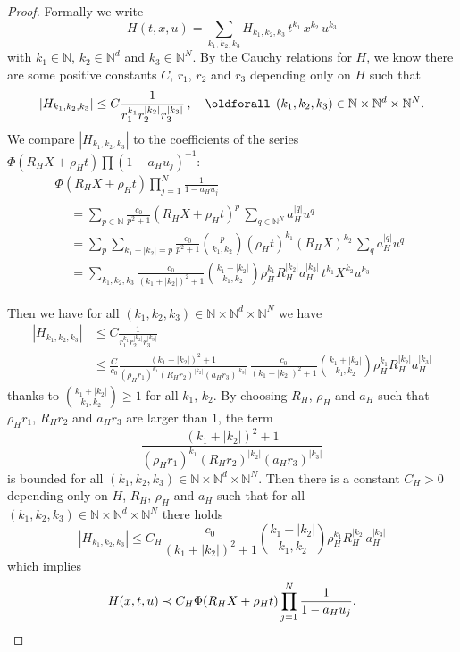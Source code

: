 \documentclass[AHL,Unicode,longabstracts,published]{cedram}
\theoremstyle{plain}
\newcommand*\N{{\mathbb N}}
\newcommand*\dsp{\displaystyle}
\renewcommand*{\forall}{\mathrel{\oldforall}}
\begin{document}
\begin{proof}
Formally we write
\[
H(t,x,u) = \sum_{k_1,k_2,k_3} H_{k_1,k_2,k_3} \,t^{k_1} \,x^{k_2} \, u^{k_3}
\]
with $k_1\in\N$, $k_2\in\N^{d}$ and $k_3\in\N^{N}$. By the Cauchy relations for $H$, we know there are some positive constants $C$, $r_1$, $r_2$ and $r_3$ depending only on $H$ such that
\[
|H_{k_1,k_2,k_3}| \leq C\frac{\dsp 1}{\dsp r_1^{k_1}r_2^{|k_2|}r_3^{|k_3|}} \,, \quad \forall \,(k_1, k_2,k_3)\in\N \times\N^{d} \times \N^{N}.
\]
We compare $ |H_{k_1,k_2,k_3}| $ to the coefficients of the series $\Phi(R_HX + \rho_H t)\prod \left(1 - a_H u_j\right)^{-1}$:
\begin{multline*}
\Phi(R_HX + \rho_H t) \prod_{j=1}^{N}\frac{\dsp 1}{1 - a_Hu_j} \\
\begin{aligned}
& = \sum_{p\in\N} \frac{c_0}{p^2+1} \left(R_HX+\rho_Ht\right)^{p} \, \sum_{q\in\N^{N}} a_H^{|q|}u^{q} \\
& = \sum_{p} \sum_{k_1 + |k_2| = p} \frac{c_0}{p^2+1} \binom{p}{k_1,k_2} (\rho_H t)^{k_1} (R_HX)^{k_2} \, \sum_{q} a_H^{|q|}u^{q} \\
& = \sum_{k_1,k_2,k_3} \frac{c_0}{(k_1 + |k_2|)^2+1} \binom{k_1 + |k_2|}{k_1,k_2} \rho_H^{k_1} R_H^{|k_2|} a_H^{|k_3|} \, t^{k_1} X^{k_2} u^{k_3}
\end{aligned}
\end{multline*}


Then we have for all $(k_1, k_2,k_3)\in\N \times\N^{d} \times \N^{N}$ we have
\begin{align*}
|H_{k_1,k_2,k_3}| & \leq C\frac{\dsp 1}{\dsp r_1^{k_1}r_2^{|k_2|}r_3^{|k_3|}} \\
& \leq \frac{C}{c_0} \frac{\dsp (k_1+|k_2|)^2 + 1}{\dsp (\rho_Hr_1)^{k_1} (R_Hr_2)^{|k_2|} (a_Hr_3)^{|k_3|}} \, \frac{c_0}{(k_1+|k_2|)^2+1} \binom{k_1+|k_2|}{k_1,k_2} \rho_H^{k_1} R_H^{|k_2|} a_H^{|k_3|}
\end{align*}
thanks to $\binom{k_1+|k_2|}{k_1,k_2} \geq 1$ for all $k_1,\,k_2$. By choosing $R_H$, $\rho_H$ and $a_H$ such that $\rho_Hr_1$, $R_Hr_2$ and $a_Hr_3$ are larger than $1$, the term
\[
\frac{\dsp (k_1+|k_2|)^2 + 1}{\dsp (\rho_Hr_1)^{k_1} (R_Hr_2)^{|k_2|} (a_Hr_3)^{|k_3|}}
\]
is bounded for all $(k_1, k_2,k_3)\in\N \times\N^{d} \times \N^{N}$. Then there is a constant $C_H>0$ depending only on $H$, $R_H$, $\rho_H$ and $a_H$ such that for all $(k_1, k_2,k_3)\in\N \times\N^{d} \times \N^{N}$ there holds
\[
|H_{k_1,k_2,k_3}| \leq C_H \frac{c_0}{(k_1 + |k_2|)^2+1} \binom{k_1 + |k_2|}{k_1,k_2} \rho_H^{k_1} R_H^{|k_2|} a_H^{|k_3|}
\]
which implies
\[
H(x,t,u) \prec C_H \Phi(R_H X + \rho_H t) \prod_{j=1}^{N}\frac{\dsp 1}{1 - a_H u_j}.\qedhere
\]
\end{proof}
\end{document}
